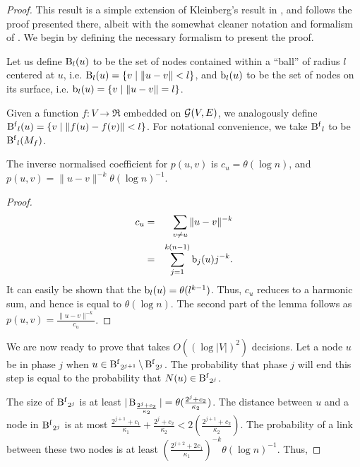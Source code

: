 \begin{proof}

This result is a simple extension of Kleinberg's result in
\cite{Kleinberg2000}, and follows the proof presented there, albeit with
the somewhat cleaner notation and formalism of \cite{Martel2004}. We
begin by defining the necessary formalism to present the proof.

\begin{definition}
Let us define $\operatorname{B}_l(u)$ to be the set of nodes contained within
a ``ball'' of radius $l$ centered at $u$, i.e.  $\operatorname{B}_l(u) = \{ v \mid
\|u - v\| < l \}$, and $\operatorname{b}_l(u)$ to be the set of nodes on its
surface, i.e. $\operatorname{b}_l(u) = \{ v \mid \|u - v\| = l \}$.

Given a function $f:V \to \Re$ embedded on $\mathcal{G}(V,E)$, we analogously
define $\operatorname{B^{f}}_l(u) = \{ v \mid \|f(u) - f(v)\| < l \}$. For notational
convenience, we take $\operatorname{B^{f}}_l$ to be $\operatorname{B^{f}}_l(M_f)$.
\end{definition}

\begin{lemma}
    The inverse normalised coefficient for $p(u,v)$ is $c_u = \theta(
    \log n )$, and $p(u,v) = \|u - v\|^{-k} \theta(\log n)^{-1}$.
\end{lemma}
\begin{proof}
    \begin{eqnarray*}
        c_u &=& \sum_{v \ne u} \|u - v\|^{-k} \\
            &=& \sum_{j=1}^{k(n-1)} \operatorname{b}_j(u) j^{-k}.
    \end{eqnarray*}
    It can easily be shown that the $\operatorname{b}_l(u) = \theta( l^{k-1} )$.
    Thus, $c_u$ reduces to a harmonic sum, and hence is equal to
    $\theta( \log n )$. The second part of the lemma follows as $p(u,v)
    = \frac{ \|u - v\|^{-k} }{c_u}$. 
\end{proof}

We are now ready to prove that \egreedyalgo takes $O( (\log |V|)^2 )$
decisions. Let a node $u$ be in phase $j$ when $u \in \operatorname{B^{f}}_{2^{j+1}}
\setminus \operatorname{B^{f}}_{2^{j}}$. The probability that phase $j$ will end this
step is equal to the probability that $N(u) \in \operatorname{B^{f}}_{2^{j}}$. 

The size of $\operatorname{B^{f}}_{2^{j}}$ is at least $|\operatorname{B}_{\frac{
2^{j}+c_2}{\kappa_2}}| = \theta(\frac{2^{j}+c_2}{\kappa_2})$. The
distance between $u$ and a node in $\operatorname{B^{f}}_{2^{j}}$ is at most
$\frac{2^{j+1} + c_1}{ \kappa_1 } + \frac{2^{j} + c_2}{\kappa_2}
< 2(\frac{2^{j+1} + c_2}{\kappa_2})$. The probability of a link between
these two nodes is at least $(\frac{2^{j+2} + 2 c_1}{\kappa_1})^{-k}
\theta(\log n)^{-1} $. Thus, 


\end{proof}
